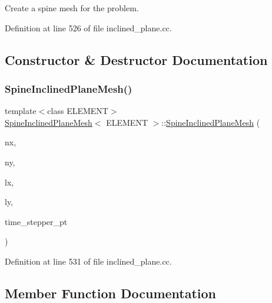 Create a spine mesh for the problem. 

Definition at line 526 of file inclined\+\_\+plane.\+cc.



\subsection{Constructor \& Destructor Documentation}
\mbox{\label{classSpineInclinedPlaneMesh_a97e770220d4cd41e11c86c5cfa289133}} 
\subsubsection{\texorpdfstring{Spine\+Inclined\+Plane\+Mesh()}{SpineInclinedPlaneMesh()}}
{\footnotesize\ttfamily template$<$class E\+L\+E\+M\+E\+NT$>$ \\
\hyperlink{classSpineInclinedPlaneMesh}{Spine\+Inclined\+Plane\+Mesh}$<$ E\+L\+E\+M\+E\+NT $>$\+::\hyperlink{classSpineInclinedPlaneMesh}{Spine\+Inclined\+Plane\+Mesh} (\begin{DoxyParamCaption}\item[{const unsigned \&}]{nx,  }\item[{const unsigned \&}]{ny,  }\item[{const double \&}]{lx,  }\item[{const double \&}]{ly,  }\item[{Time\+Stepper $\ast$}]{time\+\_\+stepper\+\_\+pt }\end{DoxyParamCaption})\hspace{0.3cm}{\ttfamily [inline]}}



Definition at line 531 of file inclined\+\_\+plane.\+cc.



\subsection{Member Function Documentation}
\mbox{\label{classSpineInclinedPlaneMesh_a01fa9c443029a6a00b1679a6785029f6}} 
